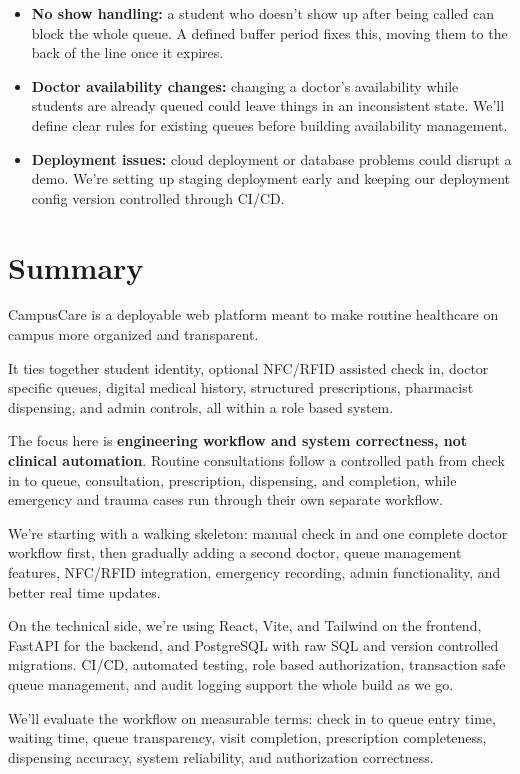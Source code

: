 \documentclass[11pt,a4paper]{article}
\begin{document}
\begin{itemize}
    \item \textbf{No show handling:} a student who doesn't show up after being called can block the whole queue. A defined buffer period fixes this, moving them to the back of the line once it expires.
    \item \textbf{Doctor availability changes:} changing a doctor's availability while students are already queued could leave things in an inconsistent state. We'll define clear rules for existing queues before building availability management.
    \item \textbf{Deployment issues:} cloud deployment or database problems could disrupt a demo. We're setting up staging deployment early and keeping our deployment config version controlled through CI/CD.
\end{itemize}


\section{Summary}

CampusCare is a deployable web platform meant to make routine healthcare on campus more organized and transparent.

It ties together student identity, optional NFC/RFID assisted check in, doctor specific queues, digital medical history, structured prescriptions, pharmacist dispensing, and admin controls, all within a role based system.

The focus here is \textbf{engineering workflow and system correctness, not clinical automation}. Routine consultations follow a controlled path from check in to queue, consultation, prescription, dispensing, and completion, while emergency and trauma cases run through their own separate workflow.

We're starting with a walking skeleton: manual check in and one complete doctor workflow first, then gradually adding a second doctor, queue management features, NFC/RFID integration, emergency recording, admin functionality, and better real time updates.

On the technical side, we're using React, Vite, and Tailwind on the frontend, FastAPI for the backend, and PostgreSQL with raw SQL and version controlled migrations. CI/CD, automated testing, role based authorization, transaction safe queue management, and audit logging support the whole build as we go.

We'll evaluate the workflow on measurable terms: check in to queue entry time, waiting time, queue transparency, visit completion, prescription completeness, dispensing accuracy, system reliability, and authorization correctness.
\end{document}
